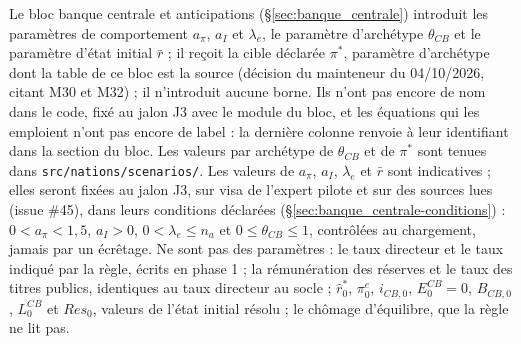 \documentclass[11pt,a4paper]{article}
\begin{document}
\begin{proposee}
Le bloc banque centrale et anticipations (\S\ref{sec:banque_centrale}) introduit les paramètres de comportement $a_\pi$, $a_I$ et $\lambda_e$, le paramètre d'archétype $\theta_{\mathit{CB}}$ et le paramètre d'état initial $\bar r$ ; il reçoit la cible déclarée $\pi^\ast$, paramètre d'archétype dont la table de ce bloc est la source (décision du mainteneur du 04/10/2026, citant M30 et M32) ; il n'introduit aucune borne. Ils n'ont pas encore de nom dans le code, fixé au jalon J3 avec le module du bloc, et les équations qui les emploient n'ont pas encore de label : la dernière colonne renvoie à leur identifiant dans la section du bloc. Les valeurs par archétype de $\theta_{\mathit{CB}}$ et de $\pi^\ast$ sont tenues dans \nolinkurl{src/nations/scenarios/}. Les valeurs de $a_\pi$, $a_I$, $\lambda_e$ et $\bar r$ sont indicatives ; elles seront fixées au jalon J3, sur visa de l'expert pilote et sur des sources lues (issue \#45), dans leurs conditions déclarées (\S\ref{sec:banque_centrale-conditions}) : $0 < a_\pi < 1{,}5$, $a_I > 0$, $0 < \lambda_e \le n_a$ et $0 \le \theta_{\mathit{CB}} \le 1$, contrôlées au chargement, jamais par un écrêtage. Ne sont pas des paramètres : le taux directeur et le taux indiqué par la règle, écrits en phase 1 ; la rémunération des réserves et le taux des titres publics, identiques au taux directeur au socle ; $\hat r^\ast_0$, $\pi^e_0$, $i_{\mathit{CB},0}$, $E^{\mathit{CB}}_0 = 0$, $B_{\mathit{CB},0}$, $L^{\mathit{CB}}_0$ et $\mathit{Res}_0$, valeurs de l'état initial résolu ; le chômage d'équilibre, que la règle ne lit pas.
\end{proposee}
\end{document}
